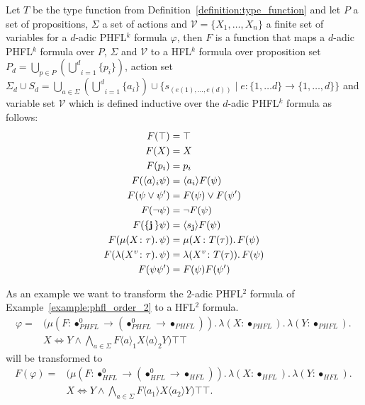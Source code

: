 \begin{definition}
    \label{definition:formula_function}
    Let $T$ be the type function from Definition~\ref{definition:type_function} and let $P$ a set of propositions,
    $\Sigma$ a set of actions and $\mathcal{V} = \{X_1, \dots, X_n\}$ a finite set of variables for a $d$-adic
    PHFL$^k$ formula $\varphi$, then $F$ is a function that maps a $d$-adic PHFL$^k$ formula over $P$, $\Sigma$ and
    $\mathcal{V}$ to a HFL$^k$ formula over proposition set $P_d = \underset{p \in P}{\bigcup}(\underset{i =
    1}{\overset{d}{\bigcup}} \{p_i\})$, action set $\Sigma_d \cup S_d = \underset{a \in \Sigma}{\bigcup}(\underset{i =
    1}{\overset{d}{\bigcup}} \{a_i\}) \cup \{s_{(e(1), \dots, e(d))} \mid e: \{1, \dots d\} \rightarrow \{1, \dots,
    d\}\}$ and variable set $\mathcal{V}$ which is defined inductive over the $d$-adic PHFL$^k$ formula as follows:
    \begin{align*}
        F(\top) &= \top\\
        F(X) &= X\\
        F(p_i) &= p_i\\
        F(\langle a \rangle_i \psi) &= \langle a_i \rangle F(\psi) \\
        F(\psi \vee \psi') &= F(\psi) \vee F(\psi') \\
        F(\neg \psi) &= \neg F(\psi) \\
        F(\{\emph{j}\,\} \psi) &= \langle s_{\emph{j}} \rangle F(\psi)  \\
        F(\mu (X \colon \tau).\,\psi) &= \mu (X \colon T(\tau)).\,F(\psi) \\
        F(\lambda (X^v \colon \tau).\, \psi) &= \lambda (X^v \colon T(\tau)).\, F(\psi) \\
        F(\psi{\psi'}) &= F(\psi)F({\psi'})
    \end{align*}
\end{definition}

\begin{example}
    As an example we want to transform the $2$-adic PHFL$^2$ formula of Example~\ref{example:phfl_order_2} to a HFL$^2$ formula.
    \begin{align*}
        \varphi = &(\mu (F \colon \bullet_{PHFL}^0 \rightarrow (\bullet_{PHFL}^0 \rightarrow \bullet_{PHFL})).\,
        \lambda (X \colon \bullet_{PHFL}).\, \lambda (Y \colon \bullet_{PHFL}).\, \\&X \Leftrightarrow Y \wedge
        \underset{a \in \Sigma}{\bigwedge} F \langle a \rangle_1 X \langle a \rangle_2 Y)\top \top
    \end{align*}
    will be transformed to
\begin{align*}
    F(\varphi) = &(\mu (F \colon \bullet_{HFL}^0 \rightarrow (\bullet_{HFL}^0 \rightarrow \bullet_{HFL})).\,
    \lambda (X \colon \bullet_{HFL}).\, \lambda (Y \colon \bullet_{HFL}).\, \\&X \Leftrightarrow Y \wedge \underset{a
    \in \Sigma}{\bigwedge} F \langle a_1 \rangle X \langle a_2 \rangle Y)\top \top.
\end{align*}
\end{example}

